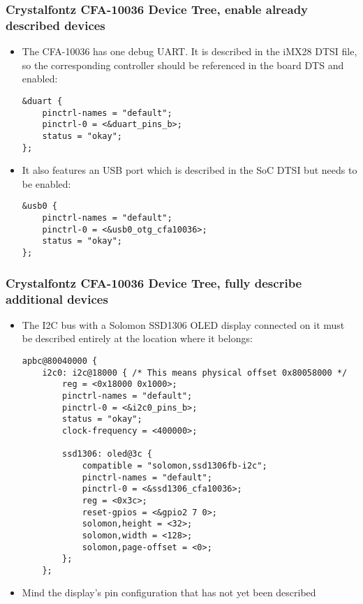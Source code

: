 \begin{frame}[fragile]
  \frametitle{Crystalfontz CFA-10036 Device Tree, enable already
    described devices}
  \begin{itemize}
  \item The CFA-10036 has one debug UART. It is described in the iMX28
    DTSI file, so the corresponding controller should be referenced in
    the board DTS and enabled:
    \begin{block}{}
      \begin{verbatim}
&duart {
    pinctrl-names = "default";
    pinctrl-0 = <&duart_pins_b>;
    status = "okay";
};
      \end{verbatim}
    \end{block}
    \item It also features an USB port which is described in the SoC
      DTSI but needs to be enabled:
      \begin{block}{}
        \begin{verbatim}
&usb0 {
    pinctrl-names = "default";
    pinctrl-0 = <&usb0_otg_cfa10036>;
    status = "okay";
};
        \end{verbatim}
      \end{block}
  \end{itemize}
\end{frame}

\begin{frame}[fragile]
  \frametitle{Crystalfontz CFA-10036 Device Tree, fully describe
    additional devices}
  \begin{itemize}
  \item The I2C bus with a Solomon SSD1306 OLED display connected on
    it must be described entirely at the location where it belongs:
    \begin{block}{}
      \begin{verbatim}
apbc@80040000 {
    i2c0: i2c@18000 { /* This means physical offset 0x80058000 */
        reg = <0x18000 0x1000>;
        pinctrl-names = "default";
        pinctrl-0 = <&i2c0_pins_b>;
        status = "okay";
        clock-frequency = <400000>;

        ssd1306: oled@3c {
            compatible = "solomon,ssd1306fb-i2c";
            pinctrl-names = "default";
            pinctrl-0 = <&ssd1306_cfa10036>;
            reg = <0x3c>;
            reset-gpios = <&gpio2 7 0>;
            solomon,height = <32>;
            solomon,width = <128>;
            solomon,page-offset = <0>;
        };
    };
      \end{verbatim}
    \end{block}
  \item Mind the display's pin configuration that has not yet been
    described
  \end{itemize}
\end{frame}

